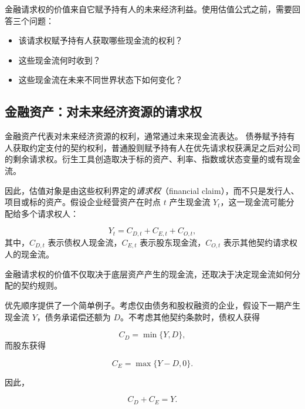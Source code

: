 金融请求权的价值来自它赋予持有人的未来经济利益。使用估值公式之前，需要回答三个问题：


\begin{itemize}[
  leftmargin=2.2em,
  itemsep=0.45em,
  topsep=0.55em
]

\item 该请求权赋予持有人获取哪些现金流的权利？

\item 这些现金流何时收到？

\item 这些现金流在未来不同世界状态下如何变化？

\end{itemize}

\subsection{金融资产：对未来经济资源的请求权}

金融资产代表对未来经济资源的权利，通常通过未来现金流表达。
债券赋予持有人获取约定支付的契约权利，普通股则赋予持有人在优先请求权获满足之后对公司的剩余请求权。衍生工具创造取决于标的资产、利率、指数或状态变量的或有现金流。

因此，估值对象是由这些权利界定的\emph{请求权}（financial claim），而不只是发行人、项目或标的资产。假设企业经营资产在时点 $t$ 产生现金流 $Y_t$，这一现金流可能分配给多个请求权人：

\begin{equation}
Y_t=C_{D,t}+C_{E,t}+C_{O,t},
\label{eq:ch5-cash-flow-allocation}
\end{equation}
其中，$C_{D,t}$ 表示债权人现金流，$C_{E,t}$ 表示股东现金流，$C_{O,t}$ 表示其他契约请求权人的现金流。

金融请求权的价值不仅取决于底层资产产生的现金流，还取决于决定现金流如何分配的契约规则。

优先顺序提供了一个简单例子。考虑仅由债务和股权融资的企业，假设下一期产生现金流 $Y$，债务承诺偿还额为 $D$。不考虑其他契约条款时，债权人获得

\begin{equation}
C_D=\min\{Y,D\},
\label{eq:ch5-debt-payoff}
\end{equation}
而股东获得

\begin{equation}
C_E=\max\{Y-D,0\}.
\label{eq:ch5-equity-payoff}
\end{equation}

因此，

\begin{equation*}
C_D+C_E=Y.
\label{eq:ch5-claim-additivity}
\end{equation*}

